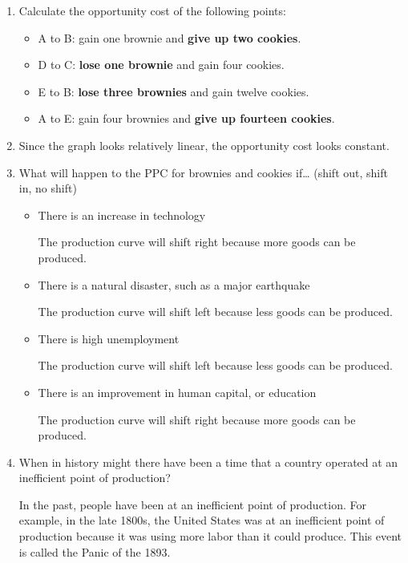 \documentclass{scrreprt} %
\begin{document}
\begin{enumerate}
\item Calculate the opportunity cost of the following points:

\begin{itemize}
	\item A to B: gain one brownie and \textbf{give up two cookies}.
	\item D to C: \textbf{lose one brownie} and gain four cookies.
	\item E to B: \textbf{lose three brownies} and gain twelve cookies.
	\item A to E: gain four brownies and \textbf{give up fourteen cookies}.
\end{itemize}

\item Since the graph looks relatively linear, the opportunity cost looks
constant.

\item What will happen to the PPC for brownies and cookies if… (shift out, shift in, no shift)
\begin{itemize}
	\item There is an increase in technology

	The production curve will shift right because more goods can be produced.

	\item There is a natural disaster, such as a major earthquake
	
	The production curve will shift left because less goods can be produced.

	\item There is high unemployment
	
	The production curve will shift left because less goods can be produced.

	\item There is an improvement in human capital, or education

	The production curve will shift right because more goods can be produced.

\end{itemize}

\item When in history might there have been a time that a country operated at an inefficient point of production?

In the past, people have been at an inefficient point of production. For example,
in the late 1800s, the United States was at an inefficient point of production
because it was using more labor than it could produce. This event is called
the Panic of the 1893.

\end{enumerate}
\end{document}
